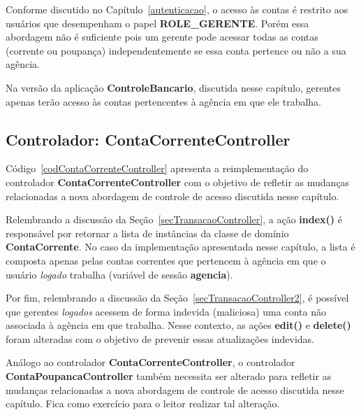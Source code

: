 \vspace{0.5cm}

Conforme discutido no Capítulo~\ref{autenticacao}, o acesso às contas é restrito
aos usuários que desempenham o  papel {\bf ROLE\_GERENTE}.  Porém essa abordagem
não  é suficiente  pois um  gerente pode  acessar todas  as contas  (corrente ou
poupança) independentemente se essa conta pertence ou não a sua agência.

Na  versão  da  aplicação  {\bf  ControleBancario},  discutida  nesse  capítulo,
gerentes  apenas  terão acesso  às  contas pertencentes  à  agência  em que  ele
trabalha. 

\subsection{Controlador: ContaCorrenteController}

\vspace{0.5cm}

Código~\ref{codContaCorrenteController}    apresenta   a    reimplementação   do
controlador {\bf ContaCorrenteController} com o objetivo de refletir as mudanças
relacionadas a nova abordagem de controle de acesso discutida nesse capítulo.  

Relembrando  a  discussão  da  Seção~\ref{secTransacaoController}, a  ação  {\bf
  index()} é responsável por retornar a lista de instâncias da classe de domínio
{\bf  ContaCorrente}.  No caso  da implementação  apresentada nesse  capítulo, a
lista é composta apenas pelas contas  correntes que pertencem à agência em que o
usuário {\it logado} trabalha (variável de sessão {\bf agencia}). 

Por  fim,  relembrando  a  discussão da  Seção~\ref{secTransacaoController2},  é
possível que  gerentes {\it logados}  acessem de forma indevida  (maliciosa) uma
conta não  associada à agência  em que trabalha.  Nesse contexto, as  ações {\bf
  edit()}  e {\bf delete()}  foram alteradas  com o  objetivo de  prevenir essas
atualizações indevidas.

\vspace{0.5cm}

\begin{remark}
Análogo  ao  controlador   {\bf  ContaCorrenteController},  o  controlador  {\bf
  ContaPoupancaController}  também  necessita  ser  alterado  para  refletir  as
mudanças relacionadas  a nova  abordagem de controle  de acesso  discutida nesse
capítulo. Fica como exercício para o leitor realizar tal alteração.
\end{remark}

